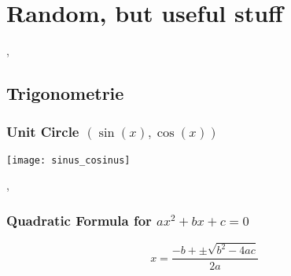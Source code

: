 \section{Random, but useful stuff}

\sep
\subsection{Trigonometrie}
\subsubsection{Unit Circle $(\sin(x), \cos(x))$}
\texttt{[image: sinus\_cosinus]}

\sep

\subsubsection{Quadratic Formula for $a x^2 + b x + c = 0$}

\[ x = \frac{-b + \pm \sqrt{b^2 - 4 a c} }{2 a} \]
